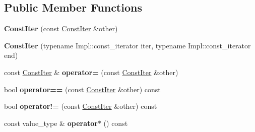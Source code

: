 \subsection*{Public Member Functions}
\begin{DoxyCompactItemize}
\item 
\hypertarget{classtheoria_1_1util_1_1densemap_1_1ConstIter_a41f22939ee0096d9d395f211fa757726}{{\bfseries Const\+Iter} (const \hyperlink{classtheoria_1_1util_1_1densemap_1_1ConstIter}{Const\+Iter} \&other)}\label{classtheoria_1_1util_1_1densemap_1_1ConstIter_a41f22939ee0096d9d395f211fa757726}

\item 
\hypertarget{classtheoria_1_1util_1_1densemap_1_1ConstIter_a393d12065a54dfadd07acb3268054695}{{\bfseries Const\+Iter} (typename Impl\+::const\+\_\+iterator iter, typename Impl\+::const\+\_\+iterator end)}\label{classtheoria_1_1util_1_1densemap_1_1ConstIter_a393d12065a54dfadd07acb3268054695}

\item 
\hypertarget{classtheoria_1_1util_1_1densemap_1_1ConstIter_a8c7a0c2774a2d4cb22aa82f83585dd27}{const \hyperlink{classtheoria_1_1util_1_1densemap_1_1ConstIter}{Const\+Iter} \& {\bfseries operator=} (const \hyperlink{classtheoria_1_1util_1_1densemap_1_1ConstIter}{Const\+Iter} \&other)}\label{classtheoria_1_1util_1_1densemap_1_1ConstIter_a8c7a0c2774a2d4cb22aa82f83585dd27}

\item 
\hypertarget{classtheoria_1_1util_1_1densemap_1_1ConstIter_ac53085842170c113e132f94477fc94a2}{bool {\bfseries operator==} (const \hyperlink{classtheoria_1_1util_1_1densemap_1_1ConstIter}{Const\+Iter} \&other) const }\label{classtheoria_1_1util_1_1densemap_1_1ConstIter_ac53085842170c113e132f94477fc94a2}

\item 
\hypertarget{classtheoria_1_1util_1_1densemap_1_1ConstIter_a28e3e50e698a6730d6465380e1f19d3c}{bool {\bfseries operator!=} (const \hyperlink{classtheoria_1_1util_1_1densemap_1_1ConstIter}{Const\+Iter} \&other) const }\label{classtheoria_1_1util_1_1densemap_1_1ConstIter_a28e3e50e698a6730d6465380e1f19d3c}

\item 
\hypertarget{classtheoria_1_1util_1_1densemap_1_1ConstIter_a354d30819cedb4921a95b6de2a3d02fe}{const value\+\_\+type \& {\bfseries operator$\ast$} () const }\label{classtheoria_1_1util_1_1densemap_1_1ConstIter_a354d30819cedb4921a95b6de2a3d02fe}


\end{DoxyCompactItemize}
